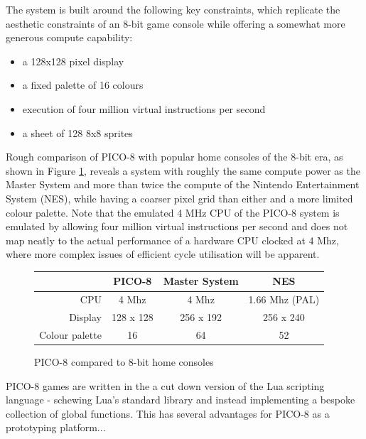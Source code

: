 \documentclass[11pt]{article}
\begin{document}
The system is built around the following key constraints\cite{white}, which replicate
the aesthetic constraints of an 8-bit game console while offering a somewhat more
generous compute capability:

\begin{itemize}
   \item a 128x128 pixel display
   \item a fixed palette of 16 colours
   \item execution of four million virtual instructions per second
   \item a sheet of 128 8x8 sprites
\end{itemize}


Rough comparison of PICO-8 with popular home consoles of the 8-bit era, as
shown in Figure \ref{fig:consolecomparison}, reveals a system with roughly the same
compute power as the Master System and more than twice the compute of the Nintendo
Entertainment System (NES), while having a coarser pixel grid than either and
a more limited colour palette. Note that the emulated 4 MHz CPU of the PICO-8 system
is emulated by allowing four million virtual instructions per second and does not
map neatly to the actual performance of a hardware CPU clocked at 4 Mhz, where more
complex issues of efficient cycle utilisation will be apparent.

\begin{figure}[h]
\begin{center}
\begin{tabular}{r|c|c|c}
      & PICO-8 & Master System\cite{mastersystem} & NES\cite{nes} \\
     \hline
     CPU & 4 Mhz & 4 Mhz & 1.66 Mhz (PAL) \\
     Display & 128 x 128 & 256 x 192 & 256 x 240 \\
     Colour palette & 16 & 64 & 52 \\
\end{tabular}
\end{center}
\caption{PICO-8 compared to 8-bit home consoles}
\label{fig:consolecomparison}
\end{figure}

PICO-8 games are written in the a cut down version of the Lua scripting language -
schewing Lua's standard library and instead implementing a bespoke collection of
global functions. This has several advantages for PICO-8 as a prototyping platform... 
\end{document}

